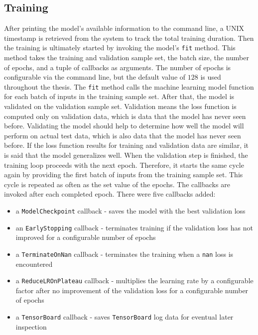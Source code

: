 \documentclass[draft,final]{vutinfth} %
\begin{document}
    \subsection{Training} \label{benchmark_training}
    After printing the model's available information to the command line, a UNIX timestamp is retrieved from the system to track the total training duration.
    Then the training is ultimately started by invoking the model's \texttt{fit} method. This method takes the training and validation sample set, the batch size, the number of epochs, and a tuple of callbacks as arguments.
    The number of epochs is configurable via the command line, but the default value of $128$ is used throughout the thesis.
    The \texttt{fit} method calls the machine learning model function for each batch of inputs in the training sample set. After that, the model is validated on the validation sample set.
    Validation means the loss function is computed only on validation data, which is data that the model has never seen before.
    Validating the model should help to determine how well the model will perform on actual test data, which is also data that the model has never seen before.
    If the loss function results for training and validation data are similar, it is said that the model generalizes well.
    When the validation step is finished, the training loop proceeds with the next epoch. Therefore, it starts the same cycle again by providing the first batch of inputs from the training sample set.
    This cycle is repeated as often as the set value of the epochs.
    The callbacks are invoked after each completed epoch. There were five callbacks added:
    \begin{itemize}
        \item{}
        a \texttt{ModelCheckpoint} callback - saves the model with the best validation loss
        \item{}
        an \texttt{EarlyStopping} callback - terminates training if the validation loss has not improved for a configurable number of epochs
        \item{}
        a \texttt{TerminateOnNan} callback - terminates the training when a \texttt{nan} loss is encountered
        \item{}
        a \texttt{ReduceLROnPlateau} callback - multiplies the learning rate by a configurable factor after no improvement of the validation loss for a configurable number of epochs
        \item{}
        a \texttt{TensorBoard} callback - saves \texttt{TensorBoard} log data for eventual later inspection
    \end{itemize}
\end{document}
